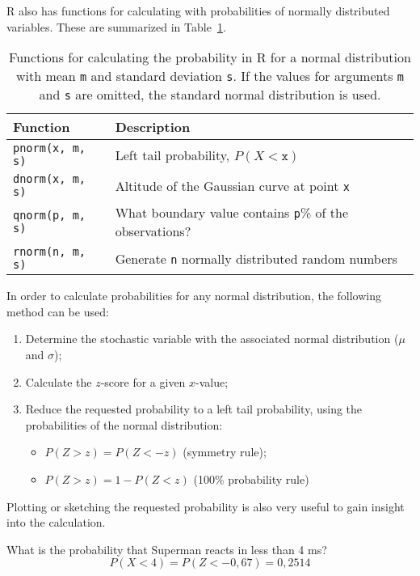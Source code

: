 R also has functions for calculating with probabilities of normally distributed variables. These are summarized in Table~\ref{rab:norm-prob-r}.

\begin{table}
  \centering
  \begin{tabular}{ll}
  	\textbf{Function}     & \textbf{Description}                                           \\ \hline
  	\verb|pnorm(x, m, s)| & Left tail probability, $P(X<\mathtt{x})$                       \\
  	\verb|dnorm(x, m, s)| & Altitude of the Gaussian curve at point \texttt{x}             \\
  	\verb|qnorm(p, m, s)| & What boundary value contains \texttt{p}\% of the observations?\\
  	\verb|rnorm(n, m, s)| & Generate \texttt{n} normally distributed random numbers
  \end{tabular}

  \caption{Functions for calculating the probability in R for a normal distribution with mean \texttt{m} and standard deviation \texttt{s}. If the values for arguments \texttt{m} and \texttt{s} are omitted, the standard normal distribution is used.}
  \label{rab:norm-prob-r}
\end{table}

In order to calculate probabilities for any normal distribution, the following method can be used:

\begin{enumerate}
  \item Determine the stochastic variable with the associated normal distribution ($\mu$ and $\sigma$);
  \item Calculate the $z$-score for a given $x$-value;
  \item Reduce the requested probability to a left tail probability, using the probabilities of the normal distribution:
  \begin{itemize}
    \item $P(Z > z) = P(Z < -z)$ (symmetry rule);
    \item $P(Z > z) = 1 - P(Z < z)$ (100\% probability rule)
  \end{itemize}
\end{enumerate}

Plotting or sketching the requested probability is also very useful to gain insight into the calculation.

\begin{example}
What is the probability that Superman reacts in less than 4 ms?
\[ P(X < 4) = P(Z < -0,67) = 0,2514 \]
\end{example}

